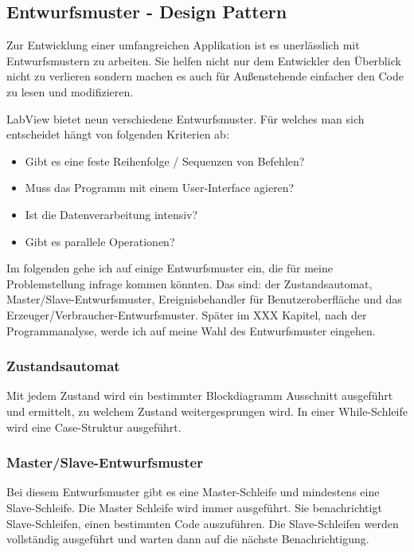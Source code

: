 	\subsection{Entwurfsmuster - Design Pattern}
Zur Entwicklung einer umfangreichen Applikation ist es unerlässlich mit Entwurfsmustern zu arbeiten. Sie helfen nicht nur dem Entwickler den Überblick nicht zu verlieren sondern machen es auch für Außenstehende einfacher den Code zu lesen und modifizieren.

LabView bietet neun verschiedene Entwurfsmuster. Für welches man sich entscheidet hängt von folgenden Kriterien ab:
\begin{itemize}
	\item Gibt es eine feste Reihenfolge / Sequenzen von Befehlen?
	\item Muss das Programm mit einem User-Interface agieren?
	\item Ist die Datenverarbeitung intensiv? 
	\item Gibt es parallele Operationen?
\end{itemize}

Im folgenden gehe ich auf einige Entwurfsmuster ein, die für meine Problemstellung infrage kommen könnten. Das sind: der Zustandsautomat, Master/Slave-Entwurfsmuster, Ereignisbehandler für Benutzeroberfläche und das Erzeuger/Verbraucher-Entwurfsmuster. Später im XXX Kapitel, nach der Programmanalyse, werde ich auf meine Wahl des Entwurfsmuster eingehen.

\subsubsection{Zustandsautomat}%
Mit jedem Zustand wird ein bestimmter Blockdiagramm Ausschnitt ausgeführt und ermittelt, zu welchem Zustand weitergesprungen wird. In einer While-Schleife wird eine Case-Struktur ausgeführt. 
	
\subsubsection{Master/Slave-Entwurfsmuster}
Bei diesem Entwurfsmuster gibt es eine Master-Schleife und mindestens eine Slave-Schleife. Die Master Schleife wird immer ausgeführt. Sie benachrichtigt Slave-Schleifen, einen bestimmten Code auszuführen. Die Slave-Schleifen werden vollständig ausgeführt und warten dann auf die nächste Benachrichtigung.

